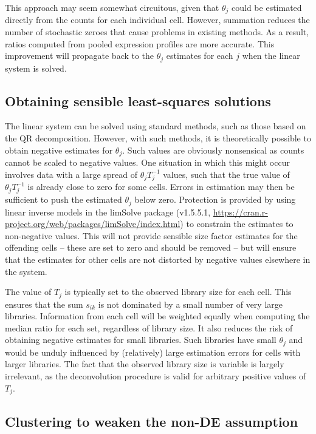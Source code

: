 \documentclass{article}
\begin{document}
This approach may seem somewhat circuitous, given that $\theta_j$ could be estimated directly from the counts for each individual cell.
However, summation reduces the number of stochastic zeroes that cause problems in existing methods.
As a result, ratios computed from pooled expression profiles are more accurate.
This improvement will propagate back to the $\theta_j$ estimates for each $j$ when the linear system is solved.

\subsection{Obtaining sensible least-squares solutions}
The linear system can be solved using standard methods, such as those based on the QR decomposition.
However, with such methods, it is theoretically possible to obtain negative estimates for $\theta_j$.
Such values are obviously nonsensical as counts cannot be scaled to negative values.
One situation in which this might occur involves data with a large spread of $\theta_jT_j^{-1}$ values, 
    such that the true value of $\theta_jT_j^{-1}$ is already close to zero for some cells.
Errors in estimation may then be sufficient to push the estimated $\theta_j$ below zero.
Protection is provided by using linear inverse models in the limSolve package (v1.5.5.1, \url{https://cran.r-project.org/web/packages/limSolve/index.html}) to constrain the estimates to non-negative values.
This will not provide sensible size factor estimates for the offending cells -- these are set to zero and should be removed --
    but will ensure that the estimates for other cells are not distorted by negative values elsewhere in the system.

The value of $T_j$ is typically set to the observed library size for each cell.
This ensures that the sum $s_{ik}$ is not dominated by a small number of very large libraries.
Information from each cell will be weighted equally when computing the median ratio for each set, regardless of library size.
It also reduces the risk of obtaining negative estimates for small libraries.
Such libraries have small $\theta_j$ and would be unduly influenced by (relatively) large estimation errors for cells with larger libraries.
The fact that the observed library size is variable is largely irrelevant, as the deconvolution procedure is valid for arbitrary positive values of $T_j$.

\subsection{Clustering to weaken the non-DE assumption}
\end{document}
